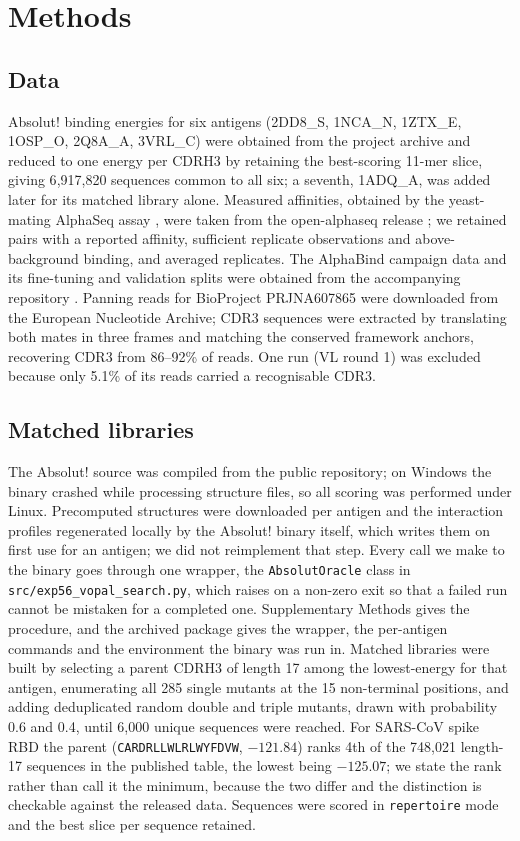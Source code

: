 \documentclass[pdflatex,sn-nature]{sn-jnl}
\theoremstyle{thmstyleone}
\theoremstyle{thmstyletwo}
\theoremstyle{thmstylethree}
\begin{document}
\section*{Methods}\label{sec:methods}

\subsection*{Data}

Absolut! binding energies for six antigens (2DD8\_S, 1NCA\_N, 1ZTX\_E,
1OSP\_O, 2Q8A\_A, 3VRL\_C) were obtained from the project archive and reduced
to one energy per CDRH3 by retaining the best-scoring 11-mer slice, giving
6{,}917{,}820 sequences common to all six; a seventh, 1ADQ\_A, was added
later for its matched library alone. Measured affinities, obtained by the
yeast-mating AlphaSeq assay \cite{younger2017}, were taken from the
open-alphaseq release \cite{engelhart2022}; we retained pairs with a
reported affinity, sufficient replicate observations and above-background
binding, and averaged replicates. The AlphaBind campaign data and its
fine-tuning and validation splits were obtained from the accompanying
repository \cite{alphabind2025}. Panning reads for BioProject PRJNA607865 were
downloaded from the European Nucleotide Archive; CDR3 sequences were extracted
by translating both mates in three frames and matching the conserved framework
anchors, recovering CDR3 from 86--92\% of reads. One run (VL round 1) was
excluded because only 5.1\% of its reads carried a recognisable CDR3.

\subsection*{Matched libraries}

The Absolut! source was compiled from the public repository; on Windows the
binary crashed while processing structure files, so all scoring was performed
under Linux. Precomputed structures were downloaded per antigen and the
interaction profiles regenerated locally by the Absolut! binary itself, which
writes them on first use for an antigen; we did not reimplement that step.
Every call we make to the binary goes through one wrapper, the
\texttt{AbsolutOracle} class in \texttt{src/exp56\_vopal\_search.py}, which
raises on a non-zero exit so that a failed run cannot be mistaken for a
completed one. Supplementary Methods gives the procedure, and the archived
package \cite{libmatch2026} gives the wrapper, the per-antigen commands and
the environment the binary was run in. Matched libraries
were built by selecting a parent CDRH3 of length 17 among the lowest-energy for
that antigen, enumerating all 285 single mutants at the 15 non-terminal
positions, and adding deduplicated random double and triple mutants, drawn
with probability 0.6 and 0.4, until 6{,}000 unique sequences were reached. For SARS-CoV spike RBD the parent
(\texttt{CARDRLLWLRLWYFDVW}, $-121.84$) ranks 4th of the 748{,}021 length-17
sequences in the published table, the lowest being $-125.07$; we state the rank
rather than call it the minimum, because the two differ and the distinction is
checkable against the released data. Sequences were scored
in \texttt{repertoire} mode and the best slice per sequence retained.
\end{document}

